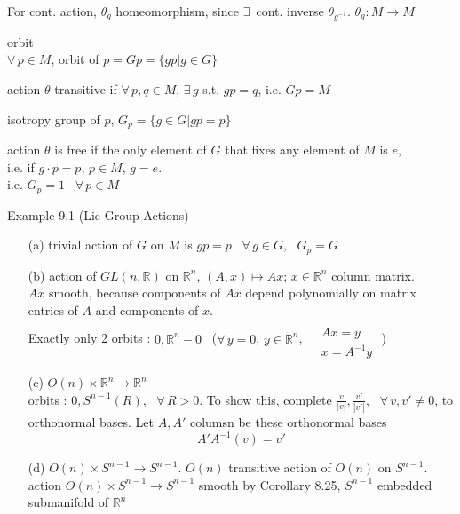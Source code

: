 \documentclass[twoside]{amsart}
\theoremstyle{plain}
\theoremstyle{definition}
\begin{document}
For cont. action, $\theta_g$ homeomorphism, since $\exists \, $ cont. inverse $\theta_{g^{-1}}$.  $\theta_g : M \to M$

orbit \\
$\forall \, p \in M$, orbit of $p = Gp = \lbrace gp | g \in G \rbrace$ 

action $\theta$ transitive if $\forall \, p, q \in M$, $\exists \, g$ s.t. $gp = q$, i.e. $Gp = M$

isotropy group of $p$, $G_p = \lbrace g \in G | gp = p \rbrace$ 

action $\theta$ is free if the only element of $G$ that fixes any element of $M$ is $e$, \\
i.e. if $g \cdot p = p$, $ p \in M$, $g=e$.  \\ 
i.e. $G_p = 1$ \, $\forall \, p \in M$

Example 9.1 (Lie Group Actions)
\begin{enumerate}
\item[(a)] trivial action of $G$ on $M$ is $gp = p$ \, $\forall \, g \in G$, \, $G_p = G$
\item[(b)] action of $GL(n,\mathbb{R}) $ on $\mathbb{R}^n$, $(A,x) \mapsto Ax$; $x \in \mathbb{R}^n$ column matrix.  \\
$Ax $ smooth, because components of $Ax$ depend polynomially on matrix entries of $A$ and components of $x$.  \\
Exactly only 2 orbits : $0, \mathbb{R}^n - 0$ \, ($\forall \, y =0$, $y\in \mathbb{R}^n$, $\begin{aligned} & \quad \\ 
  & Ax  =y \\ 
  & x = A^{-1}y \end{aligned}$ ) 
\item[(c)] $O(n) \times \mathbb{R}^n \to \mathbb{R}^n$  \\
orbits : $0, S^{n-1}(R)$, \, $\forall \, R >0$.  To show this, complete $\frac{v}{ |v|}, \frac{v'}{|v'|}$, \, $\forall \, v , v' \neq 0$, to orthonormal bases.  Let $A, A'$ columsn be these orthonormal bases 
\[
A' A^{-1}(v) = v'
\]
\item[(d)] $O(n) \times S^{n-1} \to S^{n-1}$.  $O(n)$ transitive action of $O(n)$ on $S^{n-1}$.  \\
action $O(n) \times S^{n-1} \to S^{n-1}$ smooth by Corollary 8.25, $S^{n-1}$ embedded submanifold of $\mathbb{R}^n$

\end{enumerate}
\end{document}
